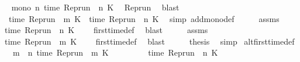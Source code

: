 \begin{isabellebody}
\ \isamarkupfalse%
\ {\isacartoucheopen}mono\ {\isacharparenleft}{\isasymlambda}n{\isachardot}\ time\ {\isacharparenleft}Rep{\isacharunderscore}run\ {\isasymrho}\ n\ K{\isacharparenright}{\isacharparenright}{\isacartoucheclose}\ \isamarkupfalse%
\ Rep{\isacharunderscore}run\ \isamarkupfalse%
\ blast\isanewline
\ \ \isamarkupfalse%
\ \isamarkupfalse%
\ \ {\isacartoucheopen}time\ {\isacharparenleft}{\isacharparenleft}Rep{\isacharunderscore}run\ {\isasymrho}{\isacharparenright}\ m\ K{\isacharparenright}\ {\isasymle}\ time\ {\isacharparenleft}{\isacharparenleft}Rep{\isacharunderscore}run\ {\isasymrho}{\isacharparenright}\ n\ K{\isacharparenright}{\isacartoucheclose}\ \isamarkupfalse%
\ {\isacharparenleft}simp\ add{\isacharcolon}mono{\isacharunderscore}def{\isacharparenright}\isanewline
\ \ \isamarkupfalse%
\ \isamarkupfalse%
\ assms{\isacharparenleft}{}{\isacharparenright}\ \isamarkupfalse%
\ {\isacartoucheopen}time\ {\isacharparenleft}{\isacharparenleft}Rep{\isacharunderscore}run\ {\isasymrho}{\isacharparenright}\ n\ K{\isacharparenright}\ {\isacharequal}\ {\isasymtau}{\isacartoucheclose}\ \isamarkupfalse%
\ first{\isacharunderscore}time{\isacharunderscore}def\ \isamarkupfalse%
\ blast\isanewline
\ \ \isamarkupfalse%
\ \isamarkupfalse%
\ assms\ \isamarkupfalse%
\ {\isacartoucheopen}time\ {\isacharparenleft}{\isacharparenleft}Rep{\isacharunderscore}run\ {\isasymrho}{\isacharparenright}\ m\ K{\isacharparenright}\ {\isasymnoteq}\ {\isasymtau}{\isacartoucheclose}\ \isamarkupfalse%
\ first{\isacharunderscore}time{\isacharunderscore}def\ \isamarkupfalse%
\ blast\isanewline
\ \ \isamarkupfalse%
\ \isamarkupfalse%
\ {\isacharquery}thesis\ \isamarkupfalse%
\ simp\isanewline
{}\isamarkupfalse%
%
\endisatagproof
{\isafoldproof}%
%
\isadelimproof
\isanewline
%
\endisadelimproof
\isanewline
{}\isamarkupfalse%
\ alt{\isacharunderscore}first{\isacharunderscore}time{\isacharunderscore}def{\isacharcolon}\isanewline
\ \ \ {\isacartoucheopen}{\isasymforall}m\ {\isacharless}\ n{\isachardot}\ time\ {\isacharparenleft}{\isacharparenleft}Rep{\isacharunderscore}run\ {\isasymrho}{\isacharparenright}\ m\ K{\isacharparenright}\ {\isacharless}\ {\isasymtau}{\isacartoucheclose}\isanewline
\ \ \ \ \ \ \ {\isacartoucheopen}time\ {\isacharparenleft}{\isacharparenleft}Rep{\isacharunderscore}run\ {\isasymrho}{\isacharparenright}\ n\ K{\isacharparenright}\ {\isacharequal}\ {\isasymtau}{\isacartoucheclose}\isanewline

\end{isabellebody}
